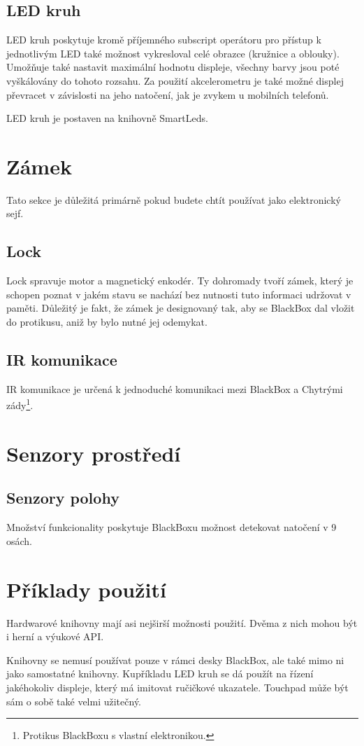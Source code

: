 \subsection{LED kruh}

LED kruh poskytuje kromě příjemného subscript operátoru pro přístup k jednotlivým LED také možnost vykresloval celé obrazce (kružnice a oblouky).
Umožňuje také nastavit maximální hodnotu displeje, všechny barvy jsou poté vyškálovány do tohoto rozsahu.
Za použití akcelerometru je také možné displej převracet v závislosti na jeho natočení, jak je zvykem u mobilních telefonů.

LED kruh je postaven na knihovně SmartLeds\cite{SmartLeds}.

\section{Zámek}

Tato sekce je důležitá primárně pokud budete chtít používat jako elektronický sejf.

\subsection{Lock}

Lock spravuje motor a magnetický enkodér.
Ty dohromady tvoří zámek, který je schopen poznat v jakém stavu se nachází bez nutnosti tuto informaci udržovat v paměti.
Důležitý je fakt, že zámek je designovaný tak, aby se BlackBox dal vložit do protikusu, aniž by bylo nutné jej odemykat.

\subsection{IR komunikace}

IR komunikace je určená k jednoduché komunikaci mezi BlackBox a Chytrými zády\footnote{Protikus BlackBoxu s vlastní elektronikou.}.


\section{Senzory prostředí}

\subsection{Senzory polohy}

Množství funkcionality poskytuje BlackBoxu možnost detekovat natočení v 9 osách.

\section{Příklady použití}

Hardwarové knihovny mají asi nejširší možnosti použití.
Dvěma z nich mohou být i herní a výukové API.

Knihovny se nemusí používat pouze v rámci desky BlackBox, ale také mimo ni jako samostatné knihovny.
Kupříkladu LED kruh se dá použít na řízení jakéhokoliv displeje, který má imitovat ručičkové ukazatele.
Touchpad může být sám o sobě také velmi užitečný.
